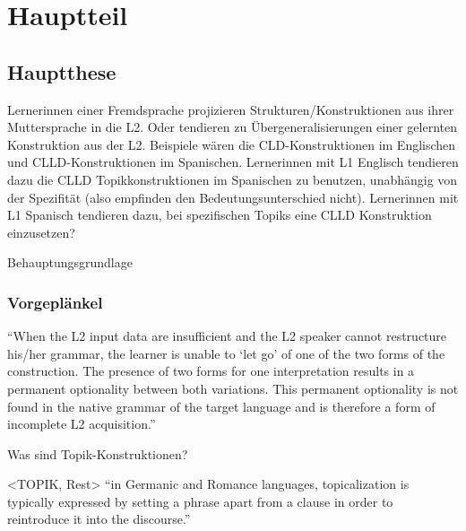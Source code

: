 \section{Hauptteil}

\subsection{Hauptthese}

Lernerinnen einer Fremdsprache projizieren Strukturen/Konstruktionen aus ihrer Muttersprache in die L2.
Oder tendieren zu Übergeneralisierungen einer gelernten Konstruktion aus der L2.
Beispiele wären die CLD-Konstruktionen im Englischen und CLLD-Konstruktionen im Spanischen.
Lernerinnen mit L1 Englisch tendieren dazu die CLLD Topikkonstruktionen im Spanischen zu benutzen, unabhängig von der Spezifität (also empfinden den Bedeutungsunterschied nicht).
Lernerinnen mit L1 Spanisch tendieren dazu, bei spezifischen Topiks eine CLLD Konstruktion einzusetzen?
\cite{Valenzuela05}


Behauptungsgrundlage


\subsubsection{Vorgeplänkel}

\cite{Valenzuela05}
``When the L2 input data are insufficient and the L2 speaker cannot restructure his/her grammar, the learner is unable to `let go' of
one of the two forms of the construction.
The presence of two forms for one interpretation results in a permanent optionality between both variations.
This permanent optionality is not found in the native grammar of the target language and is therefore a form of incomplete L2 acquisition.''

Was sind Topik-Konstruktionen?

<TOPIK, Rest>
``in Germanic and Romance languages, topicalization is typically expressed by setting a phrase apart
from a clause in order to reintroduce it into the discourse.''

